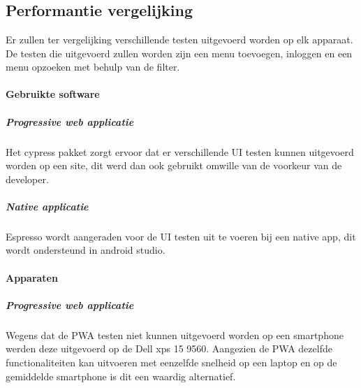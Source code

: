 
\chapter{}
\label{ch:methodologie}


\section{Performantie vergelijking}
Er zullen ter vergelijking verschillende testen uitgevoerd worden op elk apparaat. De testen die uitgevoerd zullen worden zijn een menu toevoegen, inloggen en een menu opzoeken met behulp van de filter.

\subsubsection{Gebruikte software}
\paragraph{Progressive web applicatie}
Het cypress pakket zorgt ervoor dat er verschillende UI testen kunnen uitgevoerd worden op een site, dit werd dan ook gebruikt omwille van de voorkeur van de developer.

\paragraph{Native applicatie}
Espresso wordt aangeraden voor de UI testen uit te voeren bij een native app, dit wordt ondersteund in android studio.

\subsubsection{Apparaten}
\paragraph{Progressive web applicatie}
Wegens dat de PWA testen niet kunnen uitgevoerd worden op een smartphone werden deze uitgevoerd op de Dell xps 15 9560. Aangezien de PWA dezelfde functionaliteiten kan uitvoeren met eenzelfde snelheid op een laptop en op de gemiddelde smartphone is dit een waardig alternatief.


